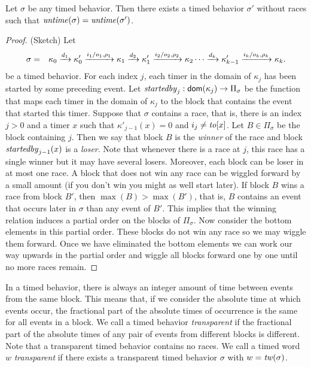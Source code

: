 \begin{lemma}
\label{race elimination}
Let $\sigma$ be any timed behavior.
Then there exists a timed behavior $\sigma'$ without races such that $\mathit{untime}(\sigma)=\mathit{untime}(\sigma')$.
\end{lemma}
\iflong
\begin{proof}
(Sketch) Let
\begin{eqnarray*}
\sigma & = & \kappa_0 \xrightarrow{d_1} \kappa'_0 \xrightarrow{i_1/o_1, \rho_1} \kappa_1 \xrightarrow{d_2} \kappa'_1 \xrightarrow{i_2/o_2, \rho_2} \kappa_2 \cdots
\xrightarrow{d_k} \kappa'_{k-1} \xrightarrow{i_k/o_k, \rho_k} \kappa_{k}.
\end{eqnarray*}
be a timed behavior.
%
For each index $j$, each timer in the domain of $\kappa_j$ has been started by some preceding event.
Let $\mathit{startedby}_j : {\textsf{dom}}(\kappa_j) \rightarrow \Pi_\sigma$ be the function that maps each timer in
the domain of $\kappa_j$ to the block that contains the event that started this timer.
Suppose that $\sigma$ contains a race, that is, there is an index $j>0$ and a timer $x$  
such that $\kappa'_{j-1}(x) = 0$ and $i_j \neq \mathit{to}[x]$.
Let $B \in \Pi_\sigma$ be the block containing $j$. Then we say that block $B$ is the \emph{winner} of the race and block
$\mathit{startedby}_{j-1}(x)$ is a \emph{loser}.
Note that whenever there is a race at $j$, this race has a single winner but it may have several losers.
Moreover, each block can be loser in at most one race.
A block that does not win any race can be wiggled forward by a small amount (if you don't win you might as well start later).
If block $B$ wins a race from block $B'$, then $\max(B)>\max(B')$, that is, $B$ contains an event that occurs later
in $\sigma$ than any event of $B'$.
This implies that the winning relation induces a partial order on the blocks of $\Pi_\sigma$.
Now consider the bottom elements in this partial order. These blocks do not win any race so we may wiggle them forward.
Once we have eliminated the bottom elements we can work our way upwards in the partial order and wiggle all blocks
forward one by one until no more races remain.
\end{proof}
\fi


In a timed behavior, there is always an integer amount of time between events from the same block.
This means that, if we consider the absolute time at which events occur, the fractional part of the absolute times
of occurrence is the same for all events in a block.
We call a timed behavior \emph{transparent} if the fractional part of the absolute times of any pair of events from different blocks is different. Note that a transparent timed behavior contains no races.
\ifshort
We call a timed word $w$ \emph{transparent} if there exists a transparent timed behavior $\sigma$ with 
$w = \mathit{tw}(\sigma)$.
\fi

